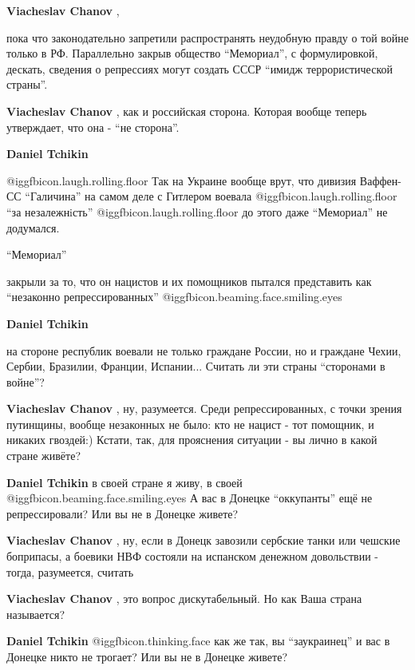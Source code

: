 \begin{itemize}
\begin{itemize}
\textbf{Viacheslav Chanov} , 

пока что законодательно запретили распространять неудобную правду о той войне
только в РФ. Параллельно закрыв общество \enquote{Мемориал}, с формулировкой, дескать,
сведения о репрессиях могут создать СССР \enquote{имидж террористической страны}.

\textbf{Viacheslav Chanov} , как и российская сторона. Которая вообще теперь утверждает, что она - \enquote{не сторона}.

\textbf{Daniel Tchikin} 

 @igg{fbicon.laugh.rolling.floor} Так на Украине вообще врут, что дивизия
 Ваффен-СС \enquote{Галичина} на самом деле с Гитлером воевала
 @igg{fbicon.laugh.rolling.floor}  \enquote{за незалежнiсть}
 @igg{fbicon.laugh.rolling.floor}  до этого даже \enquote{Мемориал} не
 додумался.

\enquote{Мемориал} 

закрыли за то, что он нацистов и их помощников пытался представить как
\enquote{незаконно репрессированных} @igg{fbicon.beaming.face.smiling.eyes} 


\textbf{Daniel Tchikin} 

на стороне республик воевали не только граждане России, но и граждане Чехии,
Сербии, Бразилии, Франции, Испании... Считать ли эти страны \enquote{сторонами в
войне}?

\textbf{Viacheslav Chanov} , ну, разумеется. Среди репрессированных, с точки зрения путинщины, вообще незаконных не было: кто не нацист - тот помощник, и никаких гвоздей:)
Кстати, так, для прояснения ситуации - вы лично в какой стране живёте?

\textbf{Daniel Tchikin} в своей стране я живу, в своей @igg{fbicon.beaming.face.smiling.eyes} 
А вас в Донецке \enquote{оккупанты} ещё не репрессировали? Или вы не в Донецке живете?

\textbf{Viacheslav Chanov} , ну, если в Донецк завозили сербские танки или чешские боприпасы, а боевики НВФ состояли на испанском денежном довольствии - тогда, разумеется, считать

\textbf{Viacheslav Chanov} , это вопрос дискутабельный.
Но как Ваша страна называется?

\textbf{Daniel Tchikin}  @igg{fbicon.thinking.face} как же так, вы \enquote{заукраинец} и вас в Донецке никто не трогает? Или вы не в Донецке живете?


\end{itemize}
\end{itemize}
